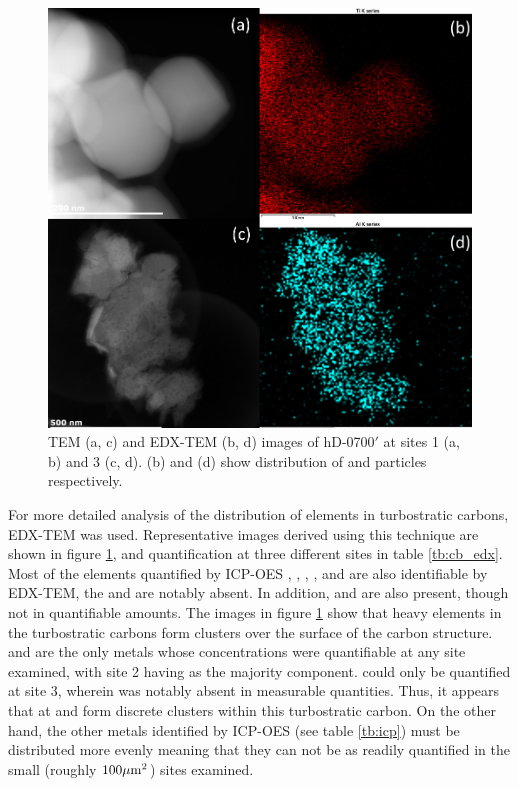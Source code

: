 \begin{figure}[b!]
    \centering
    \includegraphics[width=\columnwidth, keepaspectratio]{4-cbs/figs/EDX_TEM.png}
    \caption{TEM (a, c) and EDX-TEM (b, d) images of hD-0700$'$ at sites 1 (a, b) and 3 (c, d). (b) and (d) show distribution of  and  particles respectively.}
    \label{fig:EDX_TEM}
\end{figure}

For more detailed analysis of the distribution of elements in turbostratic carbons, EDX-TEM was used. Representative images derived using this technique are shown in figure \ref{fig:EDX_TEM}, and quantification at three different sites in table \ref{tb:cb_edx}. Most of the elements quantified by ICP-OES , , , , and  are also identifiable by EDX-TEM, the  and  are notably absent. In addition,  and  are also present, though not in quantifiable amounts. The images in figure \ref{fig:EDX_TEM} show that heavy elements in the turbostratic carbons form clusters over the surface of the carbon structure.  and  are the only metals whose concentrations were quantifiable at any site examined, with site 2 having  as the majority component.  could only be quantified at site 3, wherein  was notably absent in measurable quantities. Thus, it appears that at  and  form discrete clusters within this turbostratic carbon. On the other hand, the other metals identified by ICP-OES (see table \ref{tb:icp}) must be distributed more evenly meaning that they can not be as readily quantified in the small (roughly $\rm 100 \mu m^2$) sites examined.

